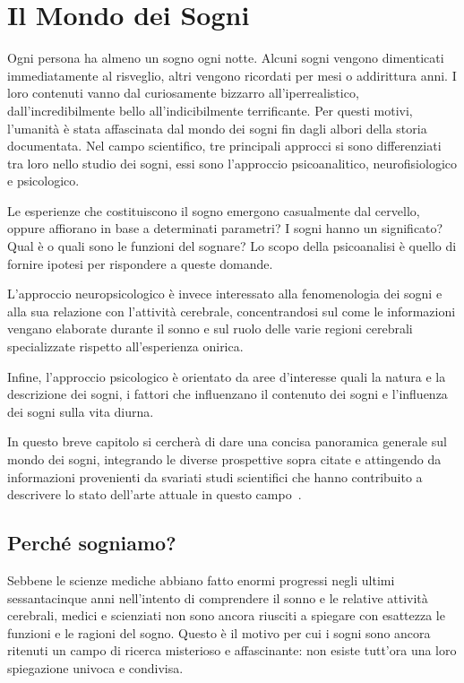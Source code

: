 \chapter{Il Mondo dei Sogni} \label{cap:mondo-dei-sogni}

Ogni persona ha almeno un sogno ogni notte.
Alcuni sogni vengono dimenticati immediatamente al risveglio, altri vengono ricordati per mesi o addirittura anni.
I loro contenuti vanno dal curiosamente bizzarro all'iperrealistico, dall'incredibilmente bello all'indicibilmente
terrificante.
Per questi motivi, l'umanità è stata affascinata dal mondo dei sogni fin dagli albori della storia documentata.
Nel campo scientifico, tre principali approcci si sono differenziati tra loro nello studio dei sogni, essi sono
l'approccio psicoanalitico, neurofisiologico e psicologico.

Le esperienze che costituiscono il sogno emergono casualmente dal cervello, oppure affiorano in base a determinati
parametri?
I sogni hanno un significato?
Qual è o quali sono le funzioni del sognare?
Lo scopo della psicoanalisi è quello di fornire ipotesi per rispondere a queste domande.

L'approccio neuropsicologico è invece interessato alla fenomenologia dei sogni e alla sua relazione con l'attività
cerebrale, concentrandosi sul come le informazioni vengano elaborate durante il sonno e sul ruolo delle varie regioni
cerebrali specializzate rispetto all'esperienza onirica.

Infine, l'approccio psicologico è orientato da aree d'interesse quali
la natura e la descrizione dei sogni, i fattori che influenzano il contenuto dei sogni e l'influenza dei sogni sulla
vita diurna.

In questo breve capitolo si cercherà di dare una concisa panoramica generale sul mondo dei sogni, integrando le diverse
prospettive sopra citate e attingendo da informazioni provenienti da svariati studi scientifici che hanno contribuito
a descrivere lo stato dell'arte attuale in questo campo~\cite{Ruby2011ExperimentalRO,Akhtar2022,Schredl2005}.


\section{Perché sogniamo?}
Sebbene le scienze mediche abbiano fatto enormi progressi negli ultimi sessantacinque anni nell'intento di comprendere
il sonno e le relative attività cerebrali, medici e scienziati non sono ancora riusciti a spiegare con esattezza le
funzioni e le ragioni del sogno.
Questo è il motivo per cui i sogni sono ancora ritenuti un campo di ricerca misterioso e affascinante: non esiste
tutt'ora una loro spiegazione univoca e condivisa.

